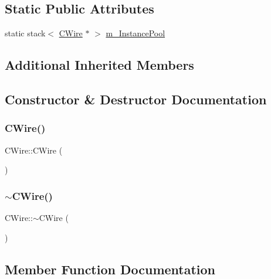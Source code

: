 \subsection*{Static Public Attributes}
\begin{DoxyCompactItemize}
\item 
static stack$<$ \mbox{\hyperlink{classCWire}{C\+Wire}} $\ast$ $>$ \mbox{\hyperlink{classCWire_ad95e3e57c6513cb487f4bbb6d0fceb60}{m\+\_\+\+Instance\+Pool}}
\end{DoxyCompactItemize}
\subsection*{Additional Inherited Members}


\subsection{Constructor \& Destructor Documentation}
\mbox{\label{classCWire_aaedab9ea265619eef584b208c675fdd3}} 
\subsubsection{\texorpdfstring{CWire()}{CWire()}}
{\footnotesize\ttfamily C\+Wire\+::\+C\+Wire (\begin{DoxyParamCaption}{ }\end{DoxyParamCaption})}

\mbox{\label{classCWire_add9cbb4215373042a505db6330fbcb6c}} 
\subsubsection{\texorpdfstring{$\sim$CWire()}{~CWire()}}
{\footnotesize\ttfamily C\+Wire\+::$\sim$\+C\+Wire (\begin{DoxyParamCaption}{ }\end{DoxyParamCaption})\hspace{0.3cm}{\ttfamily [virtual]}}



\subsection{Member Function Documentation}
\mbox{\label{classCWire_a4e6880d10696889c8f5f65bc628984c5}} 

